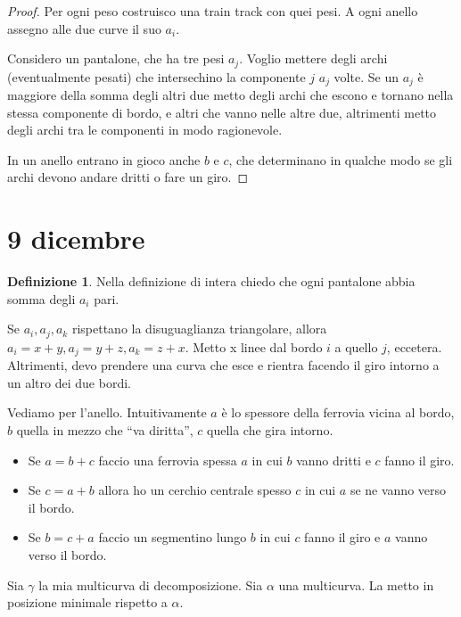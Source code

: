 \documentclass[a4paper]{article}
\theoremstyle{definition}
\newtheorem{definition}{Definizione}
\begin{document}
    \begin{proof}
        Per ogni peso costruisco una train track con quei pesi. A ogni anello assegno alle due curve il suo $a_i$.

        Considero un pantalone, che ha tre pesi $a_j$. Voglio mettere degli archi (eventualmente pesati) che intersechino la componente $j$ $a_j$ volte. Se un $a_j$ è maggiore della somma degli altri due metto degli archi che escono e tornano nella stessa componente di bordo, e altri che vanno nelle altre due, altrimenti metto degli archi tra le componenti in modo ragionevole.

        In un anello entrano in gioco anche $b$ e $c$, che determinano in qualche modo se gli archi devono andare dritti o fare un giro.
    \end{proof}
    
\section{9 dicembre}

    \begin{definition}
        Nella definizione di intera chiedo che ogni pantalone abbia somma degli $a_i$ pari.
    \end{definition}

    Se $a_i, a_j, a_k$ rispettano la disuguaglianza triangolare, allora $a_i = x + y, a_j = y + z, a_k = z + x$. Metto x linee dal bordo $i$ a quello $j$, eccetera.
    Altrimenti, devo prendere una curva che esce e rientra facendo il giro intorno a un altro dei due bordi.
    
    Vediamo per l'anello. Intuitivamente $a$ è lo spessore della ferrovia vicina al bordo, $b$ quella in mezzo che ``va diritta'', $c$ quella che gira intorno.
    \begin{itemize}
        \item Se $a = b + c$ faccio una ferrovia spessa $a$ in cui $b$ vanno dritti e $c$ fanno il giro.
        \item Se $c = a + b$ allora ho un cerchio centrale spesso $c$ in cui $a$ se ne vanno verso il bordo.
        \item Se $b = c + a$ faccio un segmentino lungo $b$ in cui $c$ fanno il giro e $a$ vanno verso il bordo.
    \end{itemize}

    Sia $\gamma$ la mia multicurva di decomposizione. Sia $\alpha$ una multicurva. La metto in posizione minimale rispetto a $\alpha$.
\end{document}
